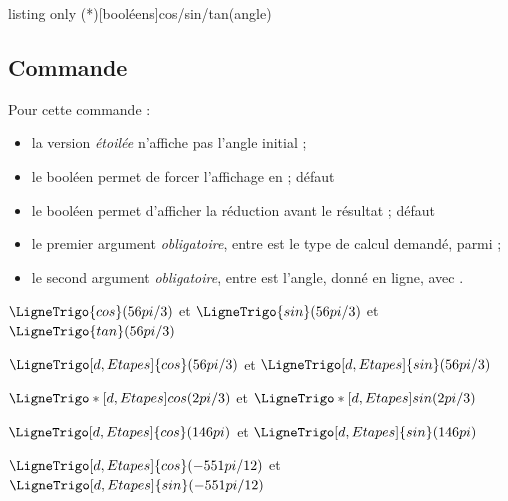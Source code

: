 \begin{PresCodeTexPL}{listing only}
\LigneTrigo(*)[booléens]{cos/sin/tan}(angle)
\end{PresCodeTexPL}

\subsection{Commande}

\begin{cautionblock}
Pour cette commande :

\begin{itemize}
	\item la version \textit{étoilée} n'affiche pas l'angle initial ;
	\item le booléen  permet de forcer l'affichage en  ; \hfill{}défaut 
	\item le booléen  permet d'afficher la réduction avant le résultat ; \hfill{}défaut 
	\item le premier argument \textit{obligatoire}, entre  est le type de calcul demandé, parmi  ;
	\item le second argument \textit{obligatoire}, entre  est l'angle, donné en ligne, avec .
\end{itemize}
\vspace*{-\baselineskip}\leavevmode
\end{cautionblock}

\begin{PresCodePL}{}
$\LigneTrigo{cos}(56pi/3)$ et $\LigneTrigo{sin}(56pi/3)$ et $\LigneTrigo{tan}(56pi/3)$
\end{PresCodePL}

\begin{PresCodePL}{}
$\LigneTrigo[d,Etapes]{cos}(56pi/3)$ et $\LigneTrigo[d,Etapes]{sin}(56pi/3)$
\end{PresCodePL}

\begin{PresCodePL}{}
$\LigneTrigo*[d,Etapes]{cos}(2pi/3)$ et $\LigneTrigo*[d,Etapes]{sin}(2pi/3)$
\end{PresCodePL}

\begin{PresCodePL}{}
$\LigneTrigo[d,Etapes]{cos}(146pi)$ et $\LigneTrigo[d,Etapes]{sin}(146pi)$
\end{PresCodePL}

\begin{PresCodePL}{}
$\LigneTrigo[d,Etapes]{cos}(-551pi/12)$ et $\LigneTrigo[d,Etapes]{sin}(-551pi/12)$
\end{PresCodePL}


